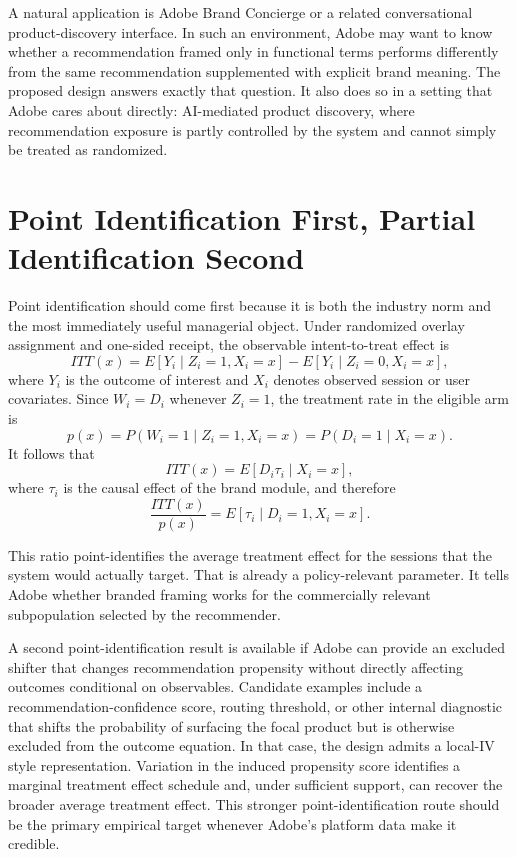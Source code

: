 \documentclass[11pt]{article}
\begin{document}
A natural application is Adobe Brand Concierge or a related conversational product-discovery interface. In such an environment, Adobe may want to know whether a recommendation framed only in functional terms performs differently from the same recommendation supplemented with explicit brand meaning. The proposed design answers exactly that question. It also does so in a setting that Adobe cares about directly: AI-mediated product discovery, where recommendation exposure is partly controlled by the system and cannot simply be treated as randomized.

\section{Point Identification First, Partial Identification Second}

Point identification should come first because it is both the industry norm and the most immediately useful managerial object. Under randomized overlay assignment and one-sided receipt, the observable intent-to-treat effect is
\[
ITT(x)=E[Y_i\mid Z_i=1,X_i=x]-E[Y_i\mid Z_i=0,X_i=x],
\]
where $Y_i$ is the outcome of interest and $X_i$ denotes observed session or user covariates. Since $W_i=D_i$ whenever $Z_i=1$, the treatment rate in the eligible arm is
\[
p(x)=P(W_i=1\mid Z_i=1,X_i=x)=P(D_i=1\mid X_i=x).
\]
It follows that
\[
ITT(x)=E[D_i\tau_i\mid X_i=x],
\]
where $\tau_i$ is the causal effect of the brand module, and therefore
\[
\frac{ITT(x)}{p(x)} = E[\tau_i \mid D_i=1, X_i=x].
\]

This ratio point-identifies the average treatment effect for the sessions that the system would actually target. That is already a policy-relevant parameter. It tells Adobe whether branded framing works for the commercially relevant subpopulation selected by the recommender.

A second point-identification result is available if Adobe can provide an excluded shifter that changes recommendation propensity without directly affecting outcomes conditional on observables. Candidate examples include a recommendation-confidence score, routing threshold, or other internal diagnostic that shifts the probability of surfacing the focal product but is otherwise excluded from the outcome equation. In that case, the design admits a local-IV style representation. Variation in the induced propensity score identifies a marginal treatment effect schedule and, under sufficient support, can recover the broader average treatment effect. This stronger point-identification route should be the primary empirical target whenever Adobe's platform data make it credible.
\end{document}
